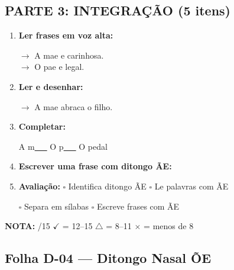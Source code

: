 \begin{exercicio}
\subsection*{PARTE 3: INTEGRAÇÃO (5 itens)}

\begin{enumerate}[resume]
  \item \textbf{Ler frases em voz alta:}
  \begin{center}
  $\rightarrow$ A mae e carinhosa.\\
  $\rightarrow$ O pae e legal.
  \end{center}

  \item \textbf{Ler e desenhar:}
  \begin{center}
  $\rightarrow$ A mae abraca o filho.
  \end{center}
  \begin{center}
  \end{center}

  \item \textbf{Completar:}
  \begin{center}
  A m\underline{~~~} \quad O p\underline{~~~} \quad O pedal
  \end{center}

  \item \textbf{Escrever uma frase com ditongo \~AE:}
  \begin{center}
  \underline{\hspace{12cm}}
  \end{center}

  \item \textbf{Avaliação:} $\square$ Identifica ditongo \~AE \quad $\square$ Le palavras com \~AE
  \begin{center}
  $\square$ Separa em sílabas \quad $\square$ Escreve frases com \~AE
  \end{center}
\end{enumerate}

\noindent\textbf{NOTA:} \underline{\hspace{1cm}}/15 \quad $\checkmark$ = 12--15 \quad $\triangle$ = 8--11 \quad $\times$ = menos de 8
\end{exercicio}


\subsection{Folha D-04 --- Ditongo Nasal \~OE}

